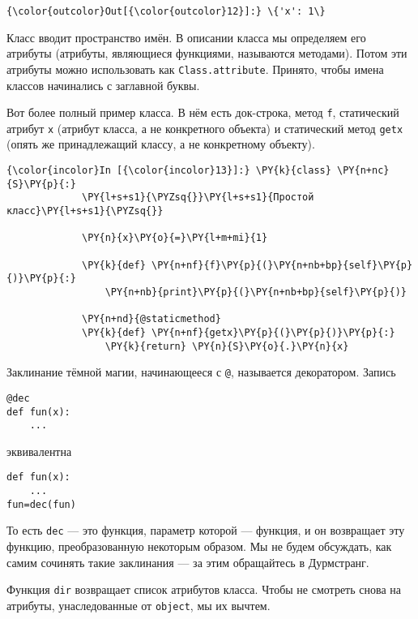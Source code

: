             \begin{Verbatim}[commandchars=\\\{\}]
{\color{outcolor}Out[{\color{outcolor}12}]:} \{'x': 1\}
\end{Verbatim}
        
    Класс вводит пространство имён. В описании класса мы определяем его
атрибуты (атрибуты, являющиеся функциями, называются методами). Потом
эти атрибуты можно использовать как \texttt{Class.attribute}. Принято,
чтобы имена классов начинались с заглавной буквы.

Вот более полный пример класса. В нём есть док-строка, метод \texttt{f},
статический атрибут \texttt{x} (атрибут класса, а не конкретного
объекта) и статический метод \texttt{getx} (опять же принадлежащий
классу, а не конкретному объекту).

    \begin{Verbatim}[commandchars=\\\{\}]
{\color{incolor}In [{\color{incolor}13}]:} \PY{k}{class} \PY{n+nc}{S}\PY{p}{:}
             \PY{l+s+s1}{\PYZsq{}}\PY{l+s+s1}{Простой класс}\PY{l+s+s1}{\PYZsq{}}
             
             \PY{n}{x}\PY{o}{=}\PY{l+m+mi}{1}
             
             \PY{k}{def} \PY{n+nf}{f}\PY{p}{(}\PY{n+nb+bp}{self}\PY{p}{)}\PY{p}{:}
                 \PY{n+nb}{print}\PY{p}{(}\PY{n+nb+bp}{self}\PY{p}{)}
             
             \PY{n+nd}{@staticmethod}
             \PY{k}{def} \PY{n+nf}{getx}\PY{p}{(}\PY{p}{)}\PY{p}{:}
                 \PY{k}{return} \PY{n}{S}\PY{o}{.}\PY{n}{x}
\end{Verbatim}

    Заклинание тёмной магии, начинающееся с \texttt{@}, называется
декоратором. Запись

\begin{verbatim}
@dec
def fun(x):
    ...
\end{verbatim}

эквивалентна

\begin{verbatim}
def fun(x):
    ...
fun=dec(fun)
\end{verbatim}

То есть \texttt{dec} --- это функция, параметр которой --- функция, и он
возвращает эту функцию, преобразованную некоторым образом. Мы не будем
обсуждать, как самим сочинять такие заклинания --- за этим обращайтесь в
Дурмстранг.

Функция \texttt{dir} возвращает список атрибутов класса. Чтобы не
смотреть снова на атрибуты, унаследованные от \texttt{object}, мы их
вычтем.

